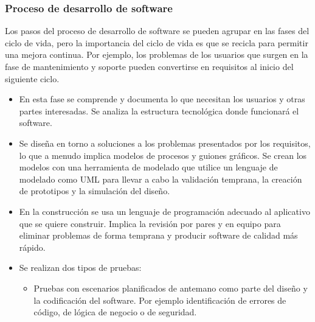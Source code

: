 \documentclass[letterpaper,10pt,spanish]{sphinxmanual}
\begin{document}
\subsubsection{Proceso de desarrollo de software}
\label{\detokenize{1_guias/10programacion/G1021:proceso-de-desarrollo-de-software}}
\sphinxAtStartPar
Los pasos del proceso de desarrollo de software se pueden agrupar en las fases del ciclo de vida, pero la importancia del ciclo de vida es que se recicla para permitir una mejora continua. Por ejemplo, los problemas de los usuarios que surgen en la fase de mantenimiento y soporte pueden convertirse en requisitos al inicio del siguiente ciclo.
\begin{itemize}
\item {} 
\sphinxAtStartPar
{}

\sphinxAtStartPar
En esta fase se comprende y documenta lo que necesitan los usuarios y otras partes interesadas. Se analiza la estructura tecnológica donde funcionará el software.

\item {} 
\sphinxAtStartPar
{}

\sphinxAtStartPar
Se diseña en torno a soluciones a los problemas presentados por los requisitos, lo que a menudo implica modelos de procesos y guiones gráficos.
Se crean los modelos con una herramienta de modelado que utilice un lenguaje de modelado como UML para llevar a cabo la validación temprana, la creación de prototipos y la simulación del diseño.

\item {} 
\sphinxAtStartPar
{}

\sphinxAtStartPar
En la construcción se usa un lenguaje de programación adecuado al aplicativo que se quiere construir. Implica la revisión por pares y en equipo para eliminar problemas de forma temprana y producir software de calidad más rápido.

\item {} 
\sphinxAtStartPar
{}

\sphinxAtStartPar
Se realizan dos tipos de pruebas:
\begin{itemize}
\item {} 
\sphinxAtStartPar
Pruebas con escenarios planificados de antemano como parte del diseño y la codificación del software. Por ejemplo identificación de errores de código, de lógica de negocio o de seguridad.


\end{itemize}
\end{itemize}
\end{document}
